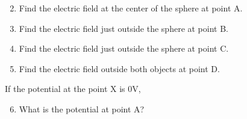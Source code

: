 \begin{enumerate}
    \setcounter{enumi}{1}
    \item Find the electric field at the center of the sphere at point A.
    \item Find the electric field just outside the sphere at point B.
    \item Find the electric field just outside the sphere at point C.
    \item Find the electric field outside both objects at point D.
\end{enumerate}
If the potential at the point X is 0V,
\begin{enumerate}
    \setcounter{enumi}{5}
    \item What is the potential at point A?
\end{enumerate}

